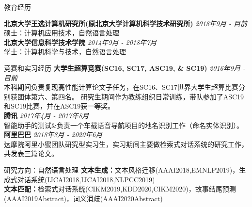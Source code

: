 \documentclass{resume} %
\begin{document}



\begin{rSection}{教育经历}

    {\bf 北京大学王选计算机研究所(原北京大学计算机科学技术研究所)} \hfill {\em 2018年9月 - 目前} 
    \\ 硕士：计算机应用技术，自然语言处理 \\
    {\bf 北京大学信息科学技术学院} \hfill {\em 2014年9月 - 2018年7月}
    \\ 学士：计算机科学与技术，自然语言处理
\end{rSection}

\vspace{-0.2cm}
\begin{rSection}{竞赛和实习经历}
    \textbf{大学生超算竞赛(SC16, SC17, ASC19, \& SC19)} \hfill {\em 2016年9月 - 目前}\\
    本科期间负责复现高性能计算论文子任务，在SC16、SC17世界大学生超算比赛分别获团体第六、第四名。
    研究生期间作为教练组织日常训练，带队参加了ASC19和SC19比赛，并在ASC19获一等奖。 \\
    \textbf{腾讯} \hfill {\em 2017年4月 - 2017年8月} \\
    智能助手的测试\&负责一个车载语音导航项目的地名识别工作（命名实体识别）。\\
    \textbf{阿里巴巴} \hfill {\em 2018年8月 - 2020年6月}\\
    达摩院阿里小蜜团队研究型实习生，实习期间主要做检索式对话系统的研究工作，共发表三篇论文。
\end{rSection}

\vspace{-0.2cm}
\begin{rSection}{研究方向：自然语言处理}
    \textbf{文本生成：}文本风格迁移(AAAI2018,EMNLP2019)，生成式对话系统(IJCAI2018,IJCAI2018,NLPCC2019) \\
    \textbf{文本匹配：}检索式对话系统(CIKM2019,KDD2020,CIKM2020)，故事结尾预测(AAAI2019Abstract)，词义消歧(AAAI2020Abstract)
\end{rSection}
\end{document}
